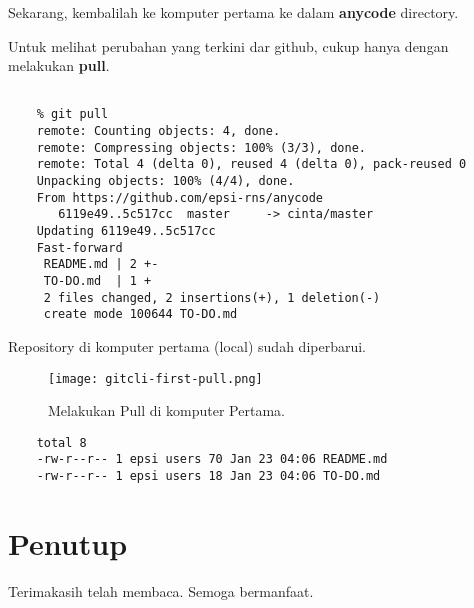 \documentclass{article}
\begin{document}
Sekarang, kembalilah ke komputer pertama ke dalam \textbf{anycode} directory.

Untuk melihat perubahan yang terkini dar github, cukup hanya dengan melakukan
\textbf{pull}.

\begin{lstlisting}[style=BashInputStyle]
    % cd anycode

    % git pull
    remote: Counting objects: 4, done.
    remote: Compressing objects: 100% (3/3), done.
    remote: Total 4 (delta 0), reused 4 (delta 0), pack-reused 0
    Unpacking objects: 100% (4/4), done.
    From https://github.com/epsi-rns/anycode
       6119e49..5c517cc  master     -> cinta/master
    Updating 6119e49..5c517cc
    Fast-forward
     README.md | 2 +-
     TO-DO.md  | 1 +
     2 files changed, 2 insertions(+), 1 deletion(-)
     create mode 100644 TO-DO.md
\end{lstlisting}

Repository di komputer pertama (local) sudah diperbarui.


\begin{figure}[H]
  \texttt{[image: gitcli-first-pull.png]}
  \caption{Melakukan Pull di komputer Pertama.}
  \label{fig:git.first.pull}
\end{figure}


\begin{lstlisting}[style=BashInputStyle]
    % ls -l
    total 8
    -rw-r--r-- 1 epsi users 70 Jan 23 04:06 README.md
    -rw-r--r-- 1 epsi users 18 Jan 23 04:06 TO-DO.md
\end{lstlisting}


\section{Penutup}

Terimakasih telah membaca.
Semoga bermanfaat.
\end{document}
